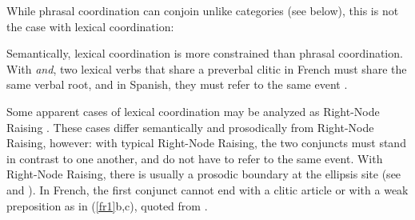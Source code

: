 {While phrasal coordination can conjoin unlike categories (see below), this is not the case with lexical coordination:

\begin{exe}
 \ex
\begin{xlista}
\end{xlista}
\end{exe}

Semantically, lexical coordination is more constrained than phrasal coordination. With \textit{and},
two lexical verbs that share a preverbal clitic in French must share the same verbal root, and in
Spanish, they must refer to the same event \citep{Bosque:86}.

\eal
{}
\zl

Some apparent cases of lexical coordination may be analyzed as Right-Node Raising
\citep{Beavers}. These cases differ semantically and prosodically from Right-Node Raising, however: with typical Right-Node
Raising, the two conjuncts must stand in contrast to one another, and do not have to refer to the
same event. With Right-Node Raising, there is usually a prosodic boundary at the ellipsis site (see
\citealt[843--844]{chavesrnr} and ). In French, the first conjunct cannot end with a clitic article or with a weak preposition as in (\ref{fr1}b,c), quoted from \citep[]{Abeille:06}.

}
